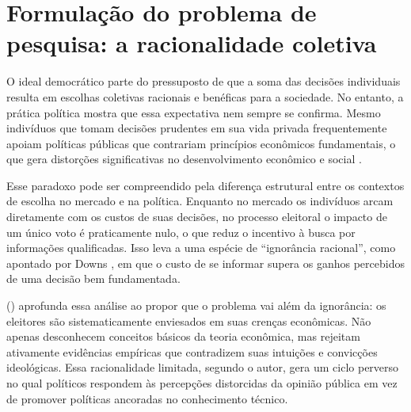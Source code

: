
\section{Formulação do problema de pesquisa: a racionalidade coletiva} %


O ideal democrático parte do pressuposto de que a soma das decisões individuais resulta em escolhas coletivas racionais e benéficas para a sociedade. No entanto, a prática política mostra que essa expectativa nem sempre se confirma. Mesmo indivíduos que tomam decisões prudentes em sua vida privada frequentemente apoiam políticas públicas que contrariam princípios econômicos fundamentais, o que gera distorções significativas no desenvolvimento econômico e social \cite{downs1957economic,The_Myth_of_the_Rational_Voter}.

Esse paradoxo pode ser compreendido pela diferença estrutural entre os contextos de escolha no mercado e na política. Enquanto no mercado os indivíduos arcam diretamente com os custos de suas decisões, no processo eleitoral o impacto de um único voto é praticamente nulo, o que reduz o incentivo à busca por informações qualificadas. Isso leva a uma espécie de ``ignorância racional'', como apontado por Downs \citeyear{downs1957economic}, em que o custo de se informar supera os ganhos percebidos de uma decisão bem fundamentada.

 (\citeyear{The_Myth_of_the_Rational_Voter}) aprofunda essa análise ao propor que o problema vai além da ignorância: os eleitores são sistematicamente enviesados em suas crenças econômicas. Não apenas desconhecem conceitos básicos da teoria econômica, mas rejeitam ativamente evidências empíricas que contradizem suas intuições e convicções ideológicas. Essa racionalidade limitada, segundo o autor, gera um ciclo perverso no qual políticos respondem às percepções distorcidas da opinião pública em vez de promover políticas ancoradas no conhecimento técnico.

